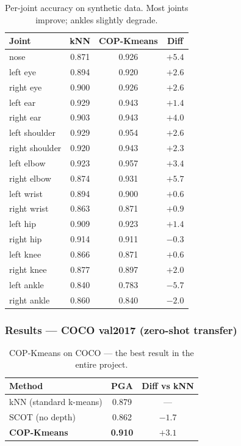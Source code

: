 \begin{table}[H]
\centering
\footnotesize
\begin{tabular}{lccc}
\toprule
Joint & kNN & COP-Kmeans & Diff \\
\midrule
nose & 0.871 & 0.926 & $+5.4$ \\
left eye & 0.894 & 0.920 & $+2.6$ \\
right eye & 0.900 & 0.926 & $+2.6$ \\
left ear & 0.929 & 0.943 & $+1.4$ \\
right ear & 0.903 & 0.943 & $+4.0$ \\
left shoulder & 0.929 & 0.954 & $+2.6$ \\
right shoulder & 0.920 & 0.943 & $+2.3$ \\
left elbow & 0.923 & 0.957 & $+3.4$ \\
right elbow & 0.874 & 0.931 & $+5.7$ \\
left wrist & 0.894 & 0.900 & $+0.6$ \\
right wrist & 0.863 & 0.871 & $+0.9$ \\
left hip & 0.909 & 0.923 & $+1.4$ \\
right hip & 0.914 & 0.911 & $-0.3$ \\
left knee & 0.866 & 0.871 & $+0.6$ \\
right knee & 0.877 & 0.897 & $+2.0$ \\
left ankle & 0.840 & 0.783 & $-5.7$ \\
right ankle & 0.860 & 0.840 & $-2.0$ \\
\bottomrule
\end{tabular}
\caption{Per-joint accuracy on synthetic data. Most joints improve; ankles slightly degrade.}
\end{table}


\subsubsection{Results --- COCO val2017 (zero-shot transfer)}

\begin{table}[H]
\centering
\footnotesize
\begin{tabular}{lcc}
\toprule
Method & PGA & Diff vs kNN \\
\midrule
kNN (standard k-means) & 0.879 & --- \\
SCOT (no depth) & 0.862 & $-1.7$ \\
\textbf{COP-Kmeans} & \textbf{0.910} & $\mathbf{+3.1}$ \\
\bottomrule
\end{tabular}
\caption{COP-Kmeans on COCO --- the best result in the entire project.}
\end{table}

